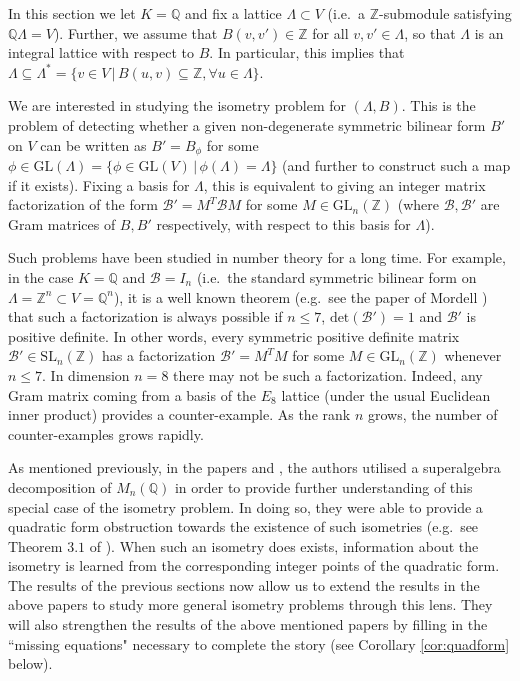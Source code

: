 \documentclass{amsart}
\theoremstyle{plain}
\theoremstyle{definition}
\begin{document}
In this section we let $K = \mathbb{Q}$ and fix a lattice $\Lambda\subset V$ (i.e.\ a $\mathbb{Z}$-submodule satisfying $\mathbb{Q}\Lambda = V$). Further, we assume that $B(v,v')\in\mathbb{Z}$ for all $v,v'\in\Lambda$, so that $\Lambda$ is an integral lattice with respect to $B$. In particular, this implies that $\Lambda\subseteq\Lambda^* = \{v\in V\,|\, B(u,v)\subseteq\mathbb{Z}, \forall u\in\Lambda\}$.

We are interested in studying the isometry problem for $(\Lambda,B)$. This is the problem of detecting whether a given non-degenerate symmetric bilinear form $B'$ on $V$ can be written as $B' = B_{\phi}$ for some $\phi\in\text{GL}(\Lambda)=\{\phi\in\text{GL}(V)\,|\,\phi(\Lambda) = \Lambda\}$ (and further to construct such a map if it exists). Fixing a basis for $\Lambda$, this is equivalent to giving an integer matrix factorization of the form $\mathcal{B}' = M^T\mathcal{B}M$ for some $M\in\text{GL}_n(\mathbb{Z})$ (where $\mathcal{B},\mathcal{B}'$ are Gram matrices of $B, B'$ respectively, with respect to this basis for $\Lambda$). 

Such problems have been studied in number theory for a long time. For example, in the case $K = \mathbb{Q}$ and $\mathcal{B} = I_n$ (i.e.\ the standard symmetric bilinear form on $\Lambda = \mathbb{Z}^n \subset V = \mathbb{Q}^n$), it is a well known theorem (e.g.\ see the paper of Mordell \cite{mordell}) that such a factorization is always possible if $n\leq 7$, $\text{det}(\mathcal{B}') = 1$ and $\mathcal{B}'$ is positive definite. In other words, every symmetric positive definite matrix $\mathcal{B}'\in\text{SL}_n(\mathbb{Z})$ has a factorization $\mathcal{B}' = M^TM$ for some $M\in\text{GL}_n(\mathbb{Z})$ whenever $n\leq 7$. In dimension $n=8$ there may not be such a factorization. Indeed, any Gram matrix coming from a basis of the $E_8$ lattice (under the usual Euclidean inner product) provides a counter-example. As the rank $n$ grows, the number of counter-examples grows rapidly. 

As mentioned previously, in the papers \cite{higham} and \cite{lettington}, the authors utilised a superalgebra decomposition of $M_n(\mathbb{Q})$ in order to provide further understanding of this special case of the isometry problem. In doing so, they were able to provide a quadratic form obstruction towards the existence of such isometries (e.g.\ see Theorem $3.1$ of \cite{higham}). When such an isometry does exists, information about the isometry is learned from the corresponding integer points of the quadratic form. The results of the previous sections now allow us to extend the results in the above papers to study more general isometry problems through this lens. They will also strengthen the results of the above mentioned papers by filling in the ``missing equations" necessary to complete the story (see Corollary \ref{cor:quadform} below).
\end{document}
